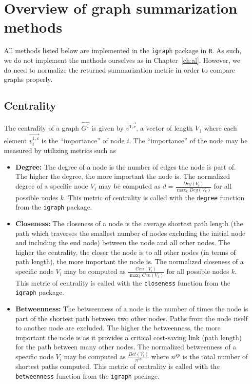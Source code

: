 \section{Overview of graph summarization methods}
\label{sec:gc:methods}

All methods listed below are implemented in the \texttt{igraph} package in 
\texttt{R}. As such, we do not implement the methods ourselves as in 
Chapter~\ref{ch:al}. However, we do need to normalize the returned 
summarization metric in order to compare graphs properly.

\subsection{Centrality}

The centrality of a graph $\hat{G^1}$ is given by $\overrightarrow{v^{1,c}}$,  
a vector of length $V_1$ where each element 
$\overrightarrow{v^{1,c}_i}$ is the ``importance'' of node $i$. The 
``importance'' of the node may be measured by utilizing metrics such as 

\tablespacing
\begin{itemize}
	\item \textbf{Degree:} The degree of a node is the number of edges the node 
	is part of. The higher the degree, the more important the node is.	
	The normalized degree of a specific node $V_i$ may be computed as 
	$d = \frac{Deg(V_i)}{\max_k Deg(V_k)}$ for all possible nodes $k$.
	This metric of centrality is called with the 	
	\texttt{degree} function from the \texttt{igraph} package.
	\item \textbf{Closeness:} The closeness of a node is the average 
	shortest path length (the path which traverses the smallest number of 
	nodes excluding the initial node and including the end node) between the 
	node and all other nodes. The higher the centrality, 
	the closer the node is to all other nodes (in terms of path length), the 
	more important the node is.	
	The normalized closeness of a specific node $V_i$ may be computed as 
	$\frac{Cen(V_i)}{\max_k Cen(V_k)}$ for all possible nodes $k$.
	This metric of centrality is called with the 
	\texttt{closeness} function from the \texttt{igraph} package.
	\item \textbf{Betweenness:} The betweenness of a node is the number of 
	times the node is part of the shortest path between two other nodes. Paths 
	from the node itself to another node are excluded. The higher the 
	betweenness, the more important the node is as it provides a critical 
	cost-saving link (path length) for the path between many other nodes. 
	The normalized betweenness of a specific node $V_i$ may be computed as
	$\frac{Bet(V_i)}{n^{sp}}$ where $n^{sp}$ is the total number of shortest 
	paths computed.
	This metric of centrality is called with the 
	\texttt{betweenness} function from the \texttt{igraph} package.
\end{itemize}
\bodyspacing

